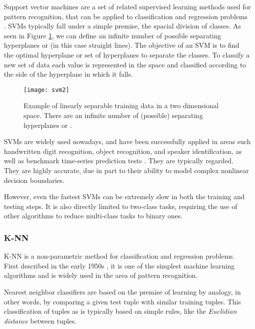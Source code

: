 Support vector machines are a set of related supervised learning methods used
for pattern recognition, that can be applied to classification and regression
problems \cite{Cortes1995}. SVMs typically fall under a simple premise, the
spacial division of classes. As seen in Figure \ref{fig:svm}, we can define an
infinite number of possible separating hyperplanes or 
(in this case straight lines). The objective of an SVM is to find the optimal
hyperplane or set of hyperplanes to separate the classes. To classify a new set
of data each value is represented in the space and classified according to the
side of the hyperplane in which it falls.

\begin{figure}[!htb]
  \begin{center}
    \leavevmode
    \texttt{[image: svm2]}
    \caption[Example of linearly separable training data]
    {Example of linearly separable training data in a two dimensional
    space. There are an infinite number of (possible) separating hyperplanes or
     \cite[p. 338]{han2006data}.}
    \label{fig:svm}
  \end{center}
\end{figure}

SVMs are widely used nowadays, and have been successfully applied in areas such
handwritten digit recognition, object recognition, and speaker identification,
as well as benchmark time-series prediction tests \cite{han2006data}. They are
typically regarded. They are highly accurate, due in part to their ability to
model complex nonlinear decision boundaries.

However, even the fastest SVMs can be extremely slow in both the training and
testing steps. It is also directly limited to two-class tasks, requiring the use
of other algorithms to reduce multi-class tasks to binary ones.

\subsubsection*{K-NN}

K-NN is a non-parametric method for classification and regression problems.
First described in the early 1950s \cite{han2006data}, it is one of the simplest
machine learning algorithms and is widely used in the area of pattern
recognition.

Nearest neighbor classifiers are based on the premise of learning by analogy, in
other words, by comparing a given test tuple with similar training tuples. This
classification of tuples as  is typically based on simple rules,
like the \textit{Euclidian distance} between tuples.

